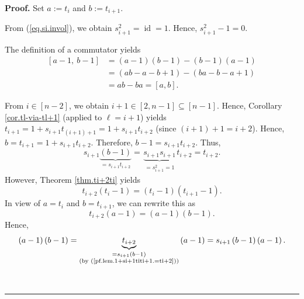 \documentclass[numbers=enddot,12pt,final,onecolumn,notitlepage]{scrartcl}%
\theoremstyle{definition}
\newenvironment{proof}[1][Proof]{\noindent\textbf{#1.} }{\ \rule{0.5em}{0.5em}}
\begin{document}
\begin{proof}
Set $a:=t_{i}$ and $b:=t_{i+1}$.

From (\ref{eq.si.invol}), we obtain $s_{i+1}^{2}=\operatorname*{id}=1$. Hence,
$s_{i+1}^{2}-1=0$.

The definition of a commutator yields%
\begin{align}
\left[  a-1,\ b-1\right]   &  =\left(  a-1\right)  \left(  b-1\right)
-\left(  b-1\right)  \left(  a-1\right) \nonumber\\
&  =\left(  ab-a-b+1\right)  -\left(  ba-b-a+1\right) \nonumber\\
&  =ab-ba=\left[  a,b\right]  . \label{pf.lem.1+si+1titi+1.-1}%
\end{align}


From $i\in\left[  n-2\right]  $, we obtain $i+1\in\left[  2,n-1\right]
\subseteq\left[  n-1\right]  $. Hence, Corollary \ref{cor.tl-via-tl+1}
(applied to $\ell=i+1$) yields $t_{i+1}=1+s_{i+1}t_{\left(  i+1\right)
+1}=1+s_{i+1}t_{i+2}$ (since $\left(  i+1\right)  +1=i+2$). Hence,
$b=t_{i+1}=1+s_{i+1}t_{i+2}$. Therefore, $b-1=s_{i+1}t_{i+2}$. Thus,%
\begin{equation}
s_{i+1}\underbrace{\left(  b-1\right)  }_{=s_{i+1}t_{i+2}}=\underbrace{s_{i+1}%
s_{i+1}}_{\substack{=s_{i+1}^{2}=1}}t_{i+2}=t_{i+2}.
\label{pf.lem.1+si+1titi+1.=ti+2}%
\end{equation}
However, Theorem \ref{thm.ti+2ti} yields
\[
t_{i+2}\left(  t_{i}-1\right)  =\left(  t_{i}-1\right)  \left(  t_{i+1}%
-1\right)  .
\]
In view of $a=t_{i}$ and $b=t_{i+1}$, we can rewrite this as%
\[
t_{i+2}\left(  a-1\right)  =\left(  a-1\right)  \left(  b-1\right)  .
\]
Hence,
\begin{equation}
\left(  a-1\right)  \left(  b-1\right)  =\underbrace{t_{i+2}}%
_{\substack{=s_{i+1}\left(  b-1\right)  \\\text{(by
(\ref{pf.lem.1+si+1titi+1.=ti+2}))}}}\left(  a-1\right)  =s_{i+1}\left(
b-1\right)  \left(  a-1\right)  . \label{pf.lem.1+si+1titi+1.3}%
\end{equation}



\end{proof}
\end{document}
